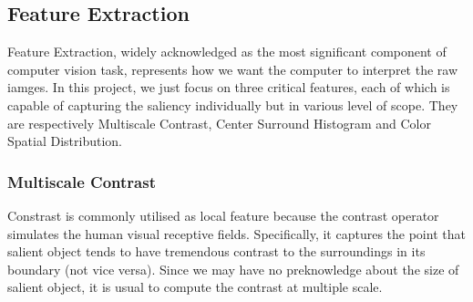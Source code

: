 \documentclass[10pt,twocolumn,letterpaper]{article}
\begin{document}
\subsection{Feature Extraction}
Feature Extraction, widely acknowledged as the most significant component of computer vision task,
represents how we want the computer to interpret the raw iamges. In this project, we just focus
on three critical features, each of which is capable of capturing the saliency individually but
in various level of scope. They are respectively Multiscale Contrast, Center Surround Histogram 
and Color Spatial Distribution. 
\subsubsection{Multiscale Contrast}
Constrast is commonly utilised as local feature because the contrast operator simulates
the human visual receptive fields. Specifically, it captures the point that salient object
tends to have tremendous contrast to the surroundings in its boundary (not vice versa).
Since we may have no preknowledge about the size of salient object, it is usual
to compute the contrast at multiple scale. 
\end{document}

